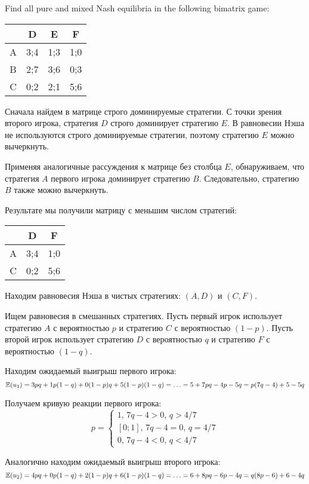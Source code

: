 \begin{problem}
Find all pure and mixed Nash equilibria in the following bimatrix game:


\begin{tabular}{c|ccc}
 & D & E & F \\
\hline
A & 3;4 & 1;3 & 1;0  \\
B & 2;7 & 3;6 & 0;3  \\
C & 0;2 & 2;1 & 5;6  \\
\end{tabular}


\begin{sol}
Сначала найдем в матрице строго доминируемые стратегии. С точки зрения второго игрока, стратегия $D$ строго доминирует стратегию $E$. В равновесии Нэша не используются строго доминируемые стратегии, поэтому стратегию $E$ можно вычеркнуть.

Применяя аналогичные рассуждения к матрице без столбца $E$, обнаруживаем, что стратегия $A$ первого игрока доминирует стратегию $B$. Следовательно, стратегию $B$ также можно вычеркнуть.

Результате мы получили матрицу с меньшим числом стратегий:

\begin{tabular}{c|cc}
 & D &  F \\
\hline
A & 3;4 &  1;0  \\
C & 0;2 &  5;6  \\
\end{tabular}

Находим равновесия Нэша в чистых стратегиях: $(A,D)$ и $(C,F)$.

Ищем равновесия в смешанных стратегиях. Пусть первый игрок использует стратегию $A$ с вероятностью $p$ и стратегию $C$ с вероятностью $(1-p)$. Пусть второй игрок использует стратегию $D$ с вероятностью $q$ и стратегию $F$ с вероятностью $(1-q)$.

Находим ожидаемый выигрыш первого игрока:
\[
\mathbb{E}(u_1)=3pq+1p(1-q)+0(1-p)q+5(1-p)(1-q)=\ldots=5+7pq-4p-5q=p(7q-4)+5-5q
\]

Получаем кривую реакции первого игрока:
\[
p=
\begin{cases}
1, \, 7q-4>0, \, q>4/7 \\
[0;1], \, 7q-4=0, \, q=4/7 \\
0, \, 7q-4<0, \, q<4/7
\end{cases}
\]


Аналогично находим ожидаемый выигрыш второго игрока:
\[
\mathbb{E}(u_2)=4pq+0p(1-q)+2(1-p)q+6(1-p)(1-q)=\ldots=6+8pq-6p-4q=q(8p-6)+6-4q
\]


\end{sol}
\end{problem}
